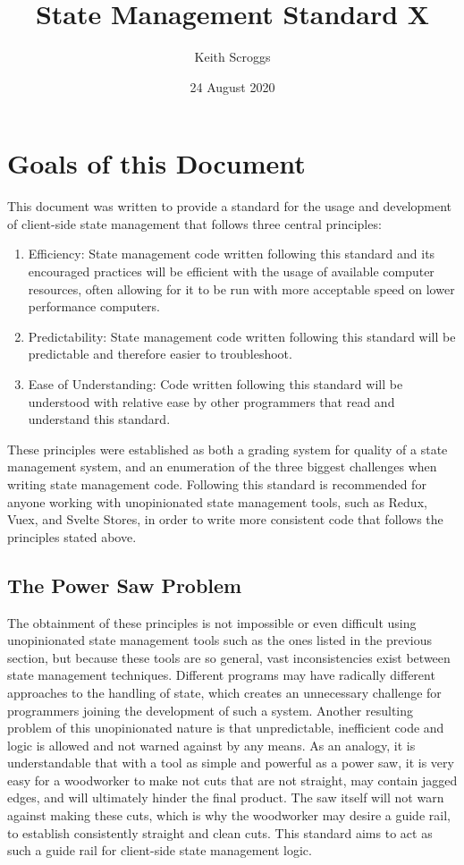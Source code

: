 \documentclass{article}
\title{State Management Standard X}
\author{Keith Scroggs}
\date{24 August 2020}
\begin{document}
\maketitle

\tableofcontents
\renewcommand{\lstlistlistingname}{Code Listings}
\renewcommand{\listoflistingscaption}{Code Listings}
\listoflistings
\newpage

\section{Goals of this Document}
This document was written to provide a standard for the usage and development of client-side state management that follows three central principles:
\begin{enumerate}
    \item Efficiency: State management code written following this standard and its encouraged practices will be efficient with the usage of available computer resources, often allowing for it to be run with more acceptable speed on lower performance computers.
    \item Predictability: State management code written following this standard will be predictable and therefore easier to troubleshoot.
    \item Ease of Understanding: Code written following this standard will be understood with relative ease by other programmers that read and understand this standard.
\end{enumerate}
These principles were established as both a grading system for quality of a state management system, and an enumeration of the three biggest challenges when writing state management code. Following this standard is recommended for anyone working with unopinionated state management tools, such as Redux, Vuex, and Svelte Stores, in order to write more consistent code that follows the principles stated above.

\subsection{The Power Saw Problem}
The obtainment of these principles is not impossible or even difficult using unopinionated state management tools such as the ones listed in the previous section, but because these tools are so general, vast inconsistencies exist between state management techniques. Different programs may have radically different approaches to the handling of state, which creates an unnecessary challenge for programmers joining the development of such a system. Another resulting problem of this unopinionated nature is that unpredictable, inefficient code and logic is allowed and not warned against by any means. As an analogy, it is understandable that with a tool as simple and powerful as a power saw, it is very easy for a woodworker to make not cuts that are not straight, may contain jagged edges, and will ultimately hinder the final product. The saw itself will not warn against making these cuts, which is why the woodworker may desire a guide rail, to establish consistently straight and clean cuts. This standard aims to act as such a guide rail for client-side state management logic.
\end{document}
